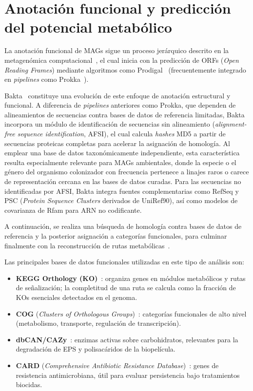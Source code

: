 \section{Anotación funcional y predicción del potencial metabólico}
\label{sec:annotation}

La anotación funcional de MAGs sigue un proceso jerárquico 
descrito en la metagenómica computacional~\cite{PitaGaleana2025}, 
el cual inicia con la predicción de ORFs (\textit{Open Reading Frames}) 
mediante algoritmos como Prodigal~\cite{Hyatt2010} (frecuentemente 
integrado en \textit{pipelines} como Prokka~\cite{prokka2014}). 

Bakta~\cite{schwengers2021} constituye una evolución de este enfoque
de anotación estructural y funcional. A diferencia de \textit{pipelines}
anteriores como Prokka, que dependen de alineamientos de secuencias
contra bases de datos de referencia limitadas, Bakta incorpora un
módulo de identificación de secuencias sin alineamiento
(\textit{alignment-free sequence identification}, AFSI), el cual
calcula \textit{hashes} MD5 a partir de secuencias proteicas completas
para acelerar la asignación de homología. Al emplear una base de datos
taxonómicamente independiente, esta característica resulta
especialmente relevante para MAGs ambientales, donde la especie o el
género del organismo colonizador con frecuencia pertenece a linajes
raros o carece de representación cercana en las bases de datos
curadas. Para las secuencias no identificadas por AFSI, Bakta integra
fuentes complementarias como RefSeq y PSC (\textit{Protein Sequence
Clusters} derivados de UniRef90), así como modelos de covarianza de
Rfam para ARN no codificante. 

A continuación, se realiza una búsqueda de homología contra bases 
de datos de referencia y la posterior asignación a categorías 
funcionales, para culminar finalmente con la reconstrucción de 
rutas metabólicas~\cite{dram2020}.

Las principales bases de datos funcionales utilizadas en este tipo de
análisis son:

\begin{itemize}
  \item \textbf{KEGG Orthology (KO)}~\cite{kegg2023}: organiza genes
    en módulos metabólicos y rutas de señalización; la completitud de
    una ruta se calcula como la fracción de KOs esenciales detectados
    en el genoma.
  \item \textbf{COG} (\textit{Clusters of Orthologous Groups})~\cite{Galperin2022}:
    categorías funcionales de alto nivel (metabolismo, transporte,
    regulación de transcripción).
  \item \textbf{dbCAN/CAZy}~\cite{cantarel2009,zhang2018}: enzimas activas sobre carbohidratos,
    relevantes para la degradación de EPS y polisacáridos de la
    biopelícula.
  \item \textbf{CARD} (\textit{Comprehensive Antibiotic Resistance
    Database})~\cite{Alcock2020}: genes de resistencia antimicrobiana, útil para evaluar
    persistencia bajo tratamientos biocidas.
\end{itemize}

